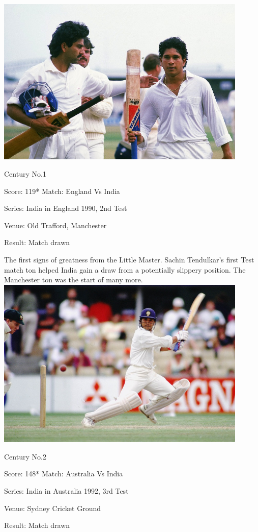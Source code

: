 \documentclass[11pt, a4paper]{article}
\begin{document}
\includegraphics[width=0.9\textwidth]{pics/1.jpg}

Century No.1 

Score: 119* Match: England Vs India 

Series: India in England 1990, 2nd Test 

Venue: Old Trafford, Manchester 

Result: Match drawn 

The first signs of greatness from the Little Master. Sachin Tendulkar's first Test match ton helped India gain a draw from a potentially slippery position. The Manchester ton was the start of many more.
\newpage
\includegraphics[width=0.9\textwidth]{pics/2.jpg}

Century No.2 

Score: 148* Match: Australia Vs India 

Series: India in Australia 1992, 3rd Test 

Venue: Sydney Cricket Ground 

Result: Match drawn
\end{document}
